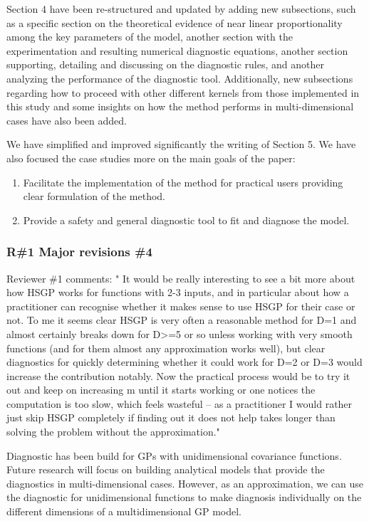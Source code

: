 \documentclass[11pt]{report}
\begin{document}
Section 4 have been re-structured and updated by adding new subsections, such as a specific section on the theoretical evidence of near linear proportionality among the key parameters of the model, another section with the experimentation and resulting numerical diagnostic equations, another section supporting, detailing and discussing on the diagnostic rules, and another analyzing the performance of the diagnostic tool. Additionally, new subsections regarding how to proceed with other different kernels from those implemented in this study and some insights on how the method performs in multi-dimensional cases have also been added.

We have simplified and improved significantly the writing of Section 5. We have also focused the case studies more on the main goals of the paper:
\begin{enumerate}
\item Facilitate the implementation of the method for practical users providing clear formulation of the method.
\item Provide a safety and general diagnostic tool to fit and diagnose the model.
\end{enumerate}
 

\subsubsection*{R\#1 Major revisions \#4}

Reviewer \#1 comments: " It would be really interesting to see a bit more about how HSGP works for functions with 2-3 inputs, and in particular about how a practitioner can recognise whether it makes sense to use HSGP for their case or not. To me it seems clear HSGP is very often a reasonable method for D=1 and almost certainly breaks down for D>=5 or so unless working with very smooth functions (and for them almost any approximation works well), but clear diagnostics for quickly determining whether it could work for D=2 or D=3 would increase the contribution notably. Now the practical process would be to try it out and keep on increasing m until it starts working or one notices the computation is too slow, which feels wasteful -- as a practitioner I would rather just skip HSGP completely if finding out it does not help takes longer than solving the problem without the approximation."

Diagnostic has been build for GPs with unidimensional covariance functions. Future research will focus on building analytical models that provide the diagnostics in multi-dimensional cases. However, as an approximation, we can use the diagnostic for unidimensional functions to make diagnosis individually on the different dimensions of a multidimensional GP model. 
\end{document}
